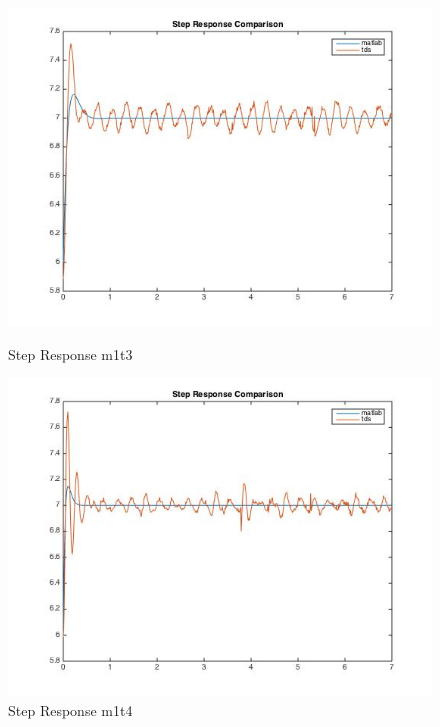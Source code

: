 \documentclass[11pt,titlepage]{article}
\begin{document}
    \begin{figure}[H]
        \centering
        \begin{minipage}{.5\textwidth}
            \centering
            \includegraphics[scale=.4]{stepM1_T3}
            \caption{Step Response m1t3}
            \label{fig:stepM1_T3}
        \end{minipage}%
        \begin{minipage}{.5\textwidth}
            \centering
            \includegraphics[scale=.4]{stepM1_T4}
            \caption{Step Response m1t4}
            \label{fig:stepM1_T4}
        \end{minipage}%
    \end{figure}
\end{document}
